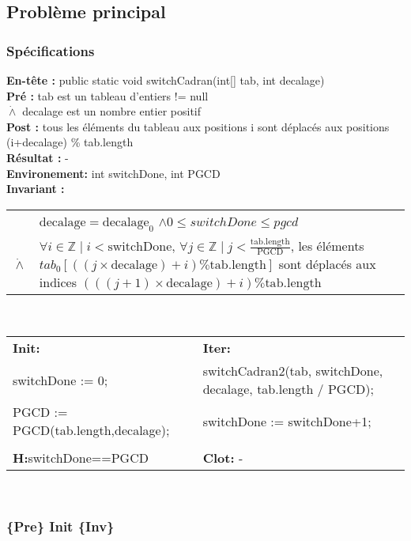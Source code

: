 \subsection{Problème principal}
\subsubsection*{Spécifications}
\noindent \textbf{En-tête :} public static void switchCadran(int[] tab, int decalage)\\
\noindent \textbf{Pré :} tab est un tableau d'entiers != null\\
\indent $\dot{\wedge}$ decalage est un nombre entier positif\\
\textbf{Post :} tous les éléments du tableau aux positions i sont déplacés aux positions (i+decalage) \% tab.length\\
\textbf{Résultat :} - \\

\noindent \textbf{Environement: } int switchDone, int PGCD\\

\noindent \textbf{Invariant :}

\begin{tabular}{lp{14cm}}

& $\mathrm{decalage}=\mathrm{decalage}_{0}$ $\wedge 0 \leq switchDone \leq pgcd$\\
$\dot{\wedge}$ & $\forall i \in \mathbb{Z} \mid i < \mathrm{switchDone} $, $\forall j \in \mathbb{Z} \mid j < \frac{\mathrm{tab.length}}{\mathrm{PGCD}}$, les éléments $tab_{0}[((j \times \mathrm{decalage}) + i) \% \mathrm{tab.length}]$ sont déplacés aux indices $(((j+1)\times \mathrm{decalage})+i) \% \mathrm{tab.length}$ \\
\end{tabular}\\

\noindent \begin{tabular}{ll}
\textbf{Init: } & \textbf{Iter: }\\
switchDone := 0; & switchCadran2(tab, switchDone, decalage, tab.length / PGCD); \\
PGCD := PGCD(tab.length,decalage); & switchDone := switchDone+1;\\
 & \\
\textbf{H:}switchDone==PGCD & \textbf{Clot: } -\\
\end{tabular}\\

\subsubsection*{\{Pre\} Init \{Inv\}}

